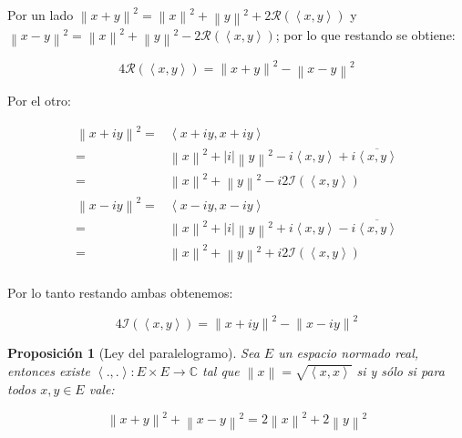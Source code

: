 \documentclass[11pt]{article}
\newcommand{\C}{\mathbb{C}}
\newcommand{\norm}[1]{\left\lVert#1\right\rVert}
\newcommand{\abs}[1]{\left\lvert#1\right\rvert}
\newcommand{\ip}[1]{\left\langle#1\right\rangle}
\numberwithin{theorem}{subsection}
\newtheorem{proposition}[theorem]{Proposici\'on}
\newenvironment{proof}[1][Demostraci\'on]{\begin{trivlist}
		\item[\hskip \labelsep {\bfseries #1}]}{\end{trivlist}}
\newcommand{\qed}{\nobreak \ifvmode \relax \else
	\ifdim\lastskip<1.5em \hskip-\lastskip
	\hskip1.5em plus0em minus0.5em \fi \nobreak
	\vrule height0.75em width0.5em depth0.25em\fi}
\begin{document}
\begin{proof}
	Por un lado $\norm{x+y}^2 = \norm{x}^2 + \norm{y}^2 + 2\mathcal{R}(\ip{x,y})$ y $\norm{x-y}^2 = \norm{x}^2 + \norm{y}^2 - 2\mathcal{R}(\ip{x,y})$; por lo que restando se obtiene:
	
	\[
		4\mathcal{R}(\ip{x,y}) = \norm{x+y}^2 - \norm{x-y}^2
	\]
	
	Por el otro: 
	
	\[
	\begin{aligned}
		\norm{x+iy}^2 = & \ip{x+iy,x+iy} \\
					  = & \norm{x}^2 + \abs{i}\norm{y}^2 -i \ip{x,y} + i \overline{\ip{x,y}} \\
					  = & \norm{x}^2 + \norm{y}^2 -i 2 \mathcal{I}(\ip{x,y}) \\
		\norm{x-iy}^2 = & \ip{x-iy,x-iy} \\
			   		  = & \norm{x}^2 + \abs{i}\norm{y}^2 +i \ip{x,y} - i \overline{\ip{x,y}} \\
					  = & \norm{x}^2 + \norm{y}^2 +i 2 \mathcal{I}(\ip{x,y}) \\
	\end{aligned}
	\]
	
	Por lo tanto restando ambas obtenemos:
	
	\[
		4\mathcal{I}(\ip{x,y}) = \norm{x+iy}^2 - \norm{x-iy}^2
	\]
	\qed
	
\end{proof}

\begin{proposition}[Ley del paralelogramo]
	\label{Ley del paralelogramo}
	Sea $E$ un espacio normado real, entonces existe $\ip{.,.}: E \times E \rightarrow \C$ tal que $\norm{x}= \sqrt{\ip{x,x}}$ si y s\'olo si para todos $x,y \in E$ vale:
	
	\[
		\norm{x+y}^2 + \norm{x-y}^2 = 2\norm{x}^2 + 2\norm{y}^2
	\]
\end{proposition}
\end{document}

